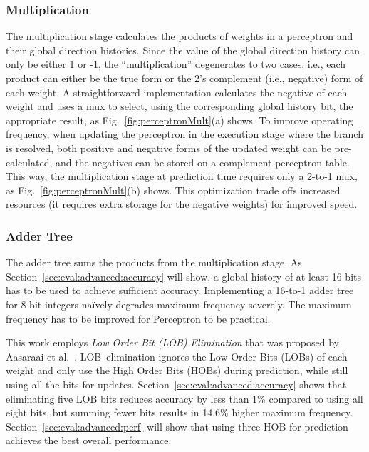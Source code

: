 \subsubsection{Multiplication}
\label{sec:advanced:perceptron:mult}
The multiplication stage calculates the products of weights in a perceptron and their global direction histories. Since the value of the global direction history can only be either 1 or -1, the ``multiplication'' degenerates to two cases, i.e., each product can either be the true form or the 2's complement (i.e., negative) form of each weight. A straightforward implementation calculates the negative of each weight and uses a mux to select, using the corresponding global history bit, the appropriate result, as Fig.~\ref{fig:perceptronMult}(a) shows. To improve operating frequency, when updating the perceptron in the execution stage where the branch is resolved, both positive and negative forms of the updated weight can be pre-calculated, and the negatives can be stored on a complement perceptron table. This way, the multiplication stage at prediction time requires only a 2-to-1 mux, as Fig.~\ref{fig:perceptronMult}(b) shows. This optimization trade offs increased resources (it requires extra storage for the negative weights) for improved speed.

\subsubsection{Adder Tree}
\label{sec:advanced:perceptron:adder}
The adder tree sums the products from the multiplication stage. As Section~\ref{sec:eval:advanced:accuracy} will show, a global history of at least 16 bits has to be used to achieve sufficient accuracy. Implementing a 16-to-1 adder tree for 8-bit integers na\"ively degrades maximum frequency severely. The maximum frequency has to be improved for Perceptron to be practical.

This work employs \textit{Low Order Bit (LOB) Elimination} that was proposed by Aasaraai et al.~\cite{lob}. LOB\ elimination ignores the Low Order Bits (LOBs) of each weight and only use the High Order Bits (HOBs) during prediction, while still using all the bits for updates. Section~\ref{sec:eval:advanced:accuracy} shows that eliminating five LOB bits reduces accuracy by less than 1\% compared to using all eight bits, but summing fewer bits results in 14.6\% higher maximum frequency. Section~\ref{sec:eval:advanced:perf} will show that using three HOB for prediction achieves the best overall performance.

